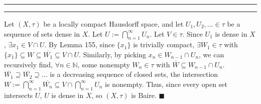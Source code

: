 \documentclass[11pt]{article}
\newcounter{questionCounter}
\newcounter{partCounter}[questionCounter]
\newenvironment{question}[2][\arabic{questionCounter}]{%
    \setcounter{partCounter}{0}%
    \vspace{.25in} \hrule \vspace{0.5em}%
        \noindent{\bf #2}%
    \vspace{0.8em} \hrule \vspace{.10in}%
    \addtocounter{questionCounter}{1}%
}{}
\renewcommand{\qed}{\quad $\blacksquare$}
\newcommand{\N}{\mathbb{N}} %
\begin{document}
\begin{question}{Problem 2}
Let $(X,\tau)$ be a locally compact Hausdorff space, and let $U_1,U_2, \ldots
\in \tau$ be a sequence of sets dense in $X$. Let $U := \bigcap_{n = 1}
^{\infty} U_n$. Let $V \in \tau$. Since $U_1$ is dense in $X$, $\exists x_1 \in
V \cap U$. By Lemma 155, since $\{x_1\}$ is trivially compact, $\exists W_1 \in
\tau$ with $\{x_1\} \subseteq W \subseteq \overline{W_1} \subseteq V \cap U$.
Similarly, by picking $x_n \in W_{n - 1} \cap U_n$, we can recursively find,
$\forall n \in \N$, some nonempty $W_n \in \tau$ with $\overline{W} \subseteq
W_{n - 1} \cap U_n$. $\overline{W_1} \supseteq \overline{W_2} \supseteq \ldots$
is a decreasing sequence of closed sets, the intersection $W := \bigcap_{n = 1}
^{\infty} \overline{W_n} \subseteq V \cap \bigcap_{n = 1}^{\infty} U_n$ is
nonempty. Thus, since every open set intersects $U$, $U$ is dense in $X$, so
$(X,\tau)$ is Baire. \qed
\end{question}
\end{document}
